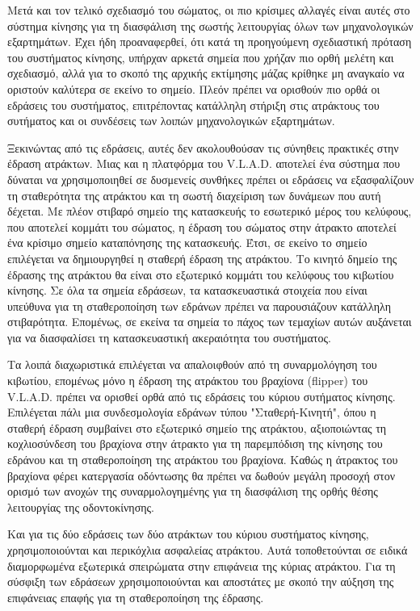 Μετά και τον τελικό σχεδιασμό του σώματος, οι πιο κρίσιμες αλλαγές είναι αυτές στο σύστημα κίνησης για τη διασφάλιση της σωστής λειτουργίας όλων των μηχανολογικών εξαρτημάτων. Έχει ήδη προαναφερθεί, ότι κατά τη προηγούμενη σχεδιαστική πρόταση του συστήματος κίνησης, υπήρχαν αρκετά σημεία που χρήζαν πιο ορθή μελέτη και σχεδιασμό, αλλά για το σκοπό της αρχικής εκτίμησης μάζας κρίθηκε μη αναγκαίο να οριστούν καλύτερα σε εκείνο το σημείο. Πλεόν πρέπει να ορισθούν πιο ορθά οι εδράσεις του συστήματος, επιτρέποντας κατάλληλη στήριξη στις ατράκτους του συτήματος και οι συνδέσεις των λοιπών μηχανολογικών εξαρτημάτων.
\par Ξεκινώντας από τις εδράσεις, αυτές δεν ακολουθούσαν τις σύνηθεις πρακτικές στην έδραση ατράκτων. Μιας και η πλατφόρμα του V.L.A.D. αποτελεί ένα σύστημα που δύναται να χρησιμοποιηθεί σε δυσμενείς συνθήκες πρέπει οι εδράσεις να εξασφαλίζουν τη σταθερότητα της ατράκτου και τη σωστή διαχείριση των δυνάμεων που αυτή δέχεται. Με πλέον στιβαρό σημείο της κατασκευής το εσωτερικό μέρος του κελύφους, που αποτελεί κομμάτι του σώματος, η έδραση του σώματος στην άτρακτο αποτελεί ένα κρίσιμο σημείο καταπόνησης της κατασκευής. Έτσι, σε εκείνο το σημείο επιλέγεται να δημιουργηθεί η σταθερή έδραση της ατράκτου. Το κινητό δημείο της έδρασης της ατράκτου θα είναι στο εξωτερικό κομμάτι του κελύφους του κιβωτίου κίνησης. Σε όλα τα σημεία εδράσεων, τα κατασκευαστικά στοιχεία που είναι υπεύθυνα για τη σταθεροποίηση των εδράνων πρέπει να παρουσιάζουν κατάλληλη στιβαρότητα. Επομένως, σε εκείνα τα σημεία το πάχος των τεμαχίων αυτών αυξάνεται για να διασφαλίσει τη κατασκευαστική ακεραιότητα του συστήματος. 
\par Τα λοιπά διαχωριστικά επιλέγεται να απαλοιφθούν από τη συναρμολόγηση του κιβωτίου, επομένως μόνο η έδραση της ατράκτου του βραχίονα (flipper) του V.L.A.D. πρέπει να ορισθεί ορθά από τις εδράσεις του κύριου συτήματος κίνησης. Επιλέγεται πάλι μια συνδεσμολογία εδράνων τύπου "Σταθερή-Κινητή", όπου η σταθερή έδραση συμβαίνει στο εξωτερικό σημείο της ατράκτου, αξιοποιώντας τη κοχλιοσύνδεση του βραχίονα στην άτρακτο για τη παρεμπόδιση της κίνησης του εδράνου και τη σταθεροποίηση της ατράκτου του βραχίονα. Καθώς η άτρακτος του βραχίονα φέρει κατεργασία οδόντωσης θα πρέπει να δωθούν μεγάλη προσοχή στον ορισμό των ανοχών της συναρμολογημένης για τη διασφάλιση της ορθής θέσης λειτουργίας της οδοντοκίνησης. 
\par Και για τις δύο εδράσεις των δύο ατράκτων του κύριου συστήματος κίνησης, χρησιμοποιούνται και περικόχλια ασφαλείας ατράκτου. Αυτά τοποθετούνται σε ειδικά διαμορφωμένα εξωτερικά σπειρώματα στην επιφάνεια της κύριας ατράκτου. Για τη σύσφιξη των εδράσεων χρησιμοποιούνται και αποστάτες με σκοπό την αύξηση της επιφάνειας επαφής για τη σταθεροποίηση της έδρασης. 
